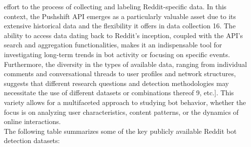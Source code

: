 \documentclass[
  12pt,
  letterpaper,
  DIV=11,
  numbers=noendperiod]{scrartcl}
\begin{document}
effort to the process of collecting and labeling Reddit-specific data.
In this context, the Pushshift API emerges as a particularly valuable
asset due to its extensive historical data and the flexibility it offers
in data collection 16. The ability to access data dating back to
Reddit's inception, coupled with the API's search and aggregation
functionalities, makes it an indispensable tool for investigating
long-term trends in bot activity or focusing on specific events.
Furthermore, the diversity in the types of available data, ranging from
individual comments and conversational threads to user profiles and
network structures, suggests that different research questions and
detection methodologies may necessitate the use of different datasets or
combinations thereof 9, etc.{]}. This variety allows for a multifaceted
approach to studying bot behavior, whether the focus is on analyzing
user characteristics, content patterns, or the dynamics of online
interactions.\\
The following table summarizes some of the key publicly available Reddit
bot detection datasets:
\end{document}
